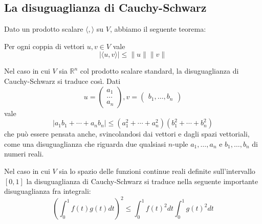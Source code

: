 
\subsection{La disuguaglianza di Cauchy-Schwarz}
Dato un prodotto scalare $\langle , \rangle$ su $V$, abbiamo il seguente
teorema:

\begin{theorem}
	Per ogni coppia di vettori $u, v \in V$ vale
	\begin{equation*}
		|\langle u, v \rangle| \leq \| u \| \| v \|
	\end{equation*}
\end{theorem}

\begin{example}
	Nel caso in cui $V$ sia $\mathbb{R}^n$ col prodotto scalare standard, la
	disuguaglianza di Cauchy-Schwarz si traduce cos\`i. Dati
	\begin{equation*}
		u = \begin{pmatrix}
			a_1 \\ \dots \\ a_n
		\end{pmatrix},
		v = \begin{pmatrix}
			b_1, \dots, b_n
		\end{pmatrix}
	\end{equation*}
	vale
	\begin{equation*}
		|a_1 b_1 + \cdots + a_n b_n| \leq
		(a_1^2 + \cdots + a_n^2)(b_1^2 + \cdots + b_n^2)
	\end{equation*}
	che pu\`o essere pensata anche, svincolandosi dai vettori e dagli spazi
	vettoriali, come una disuguaglianza che riguarda due qualsiasi $n$-uple
	$a_1, \dots, a_n$ e $b_1, \dots, b_n$ di numeri reali.
\end{example}

\begin{example}
	Nel caso in cui $V$ sia lo spazio delle funzioni continue reali definite
	sull'intervallo $[0, 1]$ la disuguaglianza di Cauchy-Schwarz si traduce
	nella seguente importante disuguaglianza fra integrali:
	\begin{equation*}
		\left( \int_0^1 f(t)g(t)dt \right)^2 \leq
		\int_0^1 f(t)^2 dt \int_0^1 g(t)^2 dt
	\end{equation*}
\end{example}